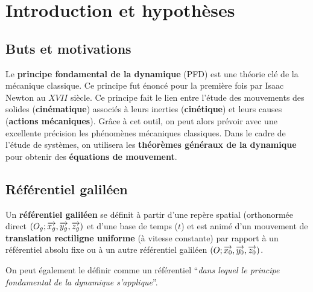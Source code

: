 \documentclass[10pt,fleqn]{article} %
\begin{document}

\setlength{\columnseprule}{.1pt}

\vspace{2cm}
\pagestyle{fancy}
\thispagestyle{plain}


\section{Introduction et hypothèses}

\subsection{Buts et motivations}
Le \textbf{principe fondamental de la dynamique} (PFD) est une théorie clé de la mécanique classique. Ce principe fut énoncé pour la première fois par Isaac Newton au $XVII$ siècle. Ce principe fait le lien entre l'étude des mouvements des solides (\textbf{cinématique}) associés à leurs inerties (\textbf{cinétique}) et leurs causes (\textbf{actions mécaniques}). Grâce à cet outil, on peut alors prévoir avec une excellente précision les phénomènes mécaniques classiques. Dans le cadre de l'étude de systèmes, on utilisera les \textbf{théorèmes généraux de la dynamique} pour obtenir des \textbf{équations de mouvement}.


\subsection{Référentiel galiléen}

\begin{definition}
Un \textbf{référentiel galiléen} se définit à partir d'une repère spatial (orthonormée direct $\left(O_g;\overrightarrow{x_g},\overrightarrow{y_g},\overrightarrow{z_g} \right)$ et d'une base de temps ($t$) et est animé d'un mouvement de \textbf{translation rectiligne uniforme} (à vitesse constante) par rapport à un référentiel absolu fixe ou à un autre référentiel galiléen $\left(O;\overrightarrow{x_0},\overrightarrow{y_0},\overrightarrow{z_0} \right)$. 

On peut également le définir comme un référentiel ``\textit{dans lequel le principe fondamental de la dynamique s'applique}''.
\end{definition}
\end{document}

